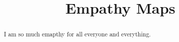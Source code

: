 \documentclass{ximera}
\title{Empathy Maps}
\begin{document}
\begin{abstract}
I am so much emapthy for all everyone and everything.
\end{abstract}
\maketitle
\end{document}
